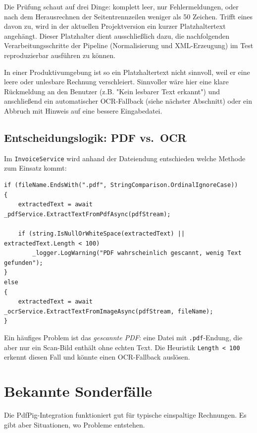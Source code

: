 Die Prüfung schaut auf drei Dinge: komplett leer, nur Fehlermeldungen, oder nach dem Herausrechnen der Seitentrennzeilen weniger als 50 Zeichen. Trifft eines davon zu, wird in der aktuellen Projektversion ein kurzer Platzhaltertext angehängt. Dieser Platzhalter dient ausschließlich dazu, die nachfolgenden Verarbeitungsschritte der Pipeline (Normalisierung und XML-Erzeugung) im Test reproduzierbar ausführen zu können.

In einer Produktivumgebung ist so ein Platzhaltertext nicht sinnvoll, weil er eine leere oder unlesbare Rechnung verschleiert. Sinnvoller wäre hier eine klare Rückmeldung an den Benutzer (z.B. "Kein lesbarer Text erkannt") und anschließend ein automatischer OCR-Fallback (siehe nächster Abschnitt) oder ein Abbruch mit Hinweis auf eine bessere Eingabedatei.

\subsection{Entscheidungslogik: PDF vs.\ OCR}

Im \texttt{InvoiceService} wird anhand der Dateiendung entschieden welche Methode zum Einsatz kommt:

\begin{lstlisting}[language={[Sharp]C}, caption={PDF-oder-OCR-Entscheidung}, label={lst:extraction_decision}]
if (fileName.EndsWith(".pdf", StringComparison.OrdinalIgnoreCase))
{
    extractedText = await _pdfService.ExtractTextFromPdfAsync(pdfStream);
    
    if (string.IsNullOrWhiteSpace(extractedText) || extractedText.Length < 100)
        _logger.LogWarning("PDF wahrscheinlich gescannt, wenig Text gefunden");
}
else
{
    extractedText = await _ocrService.ExtractTextFromImageAsync(pdfStream, fileName);
}
\end{lstlisting}

Ein häufiges Problem ist das \textit{gescannte PDF}: eine Datei mit \texttt{.pdf}-Endung, die aber nur ein Scan-Bild enthält ohne echten Text. Die Heuristik \texttt{Length < 100} erkennt diesen Fall und könnte einen OCR-Fallback auslösen.

\section{Bekannte Sonderfälle}
\label{sec:sonderfaelle}

Die PdfPig-Integration funktioniert gut für typische einspaltige Rechnungen. Es gibt aber Situationen, wo Probleme entstehen.

